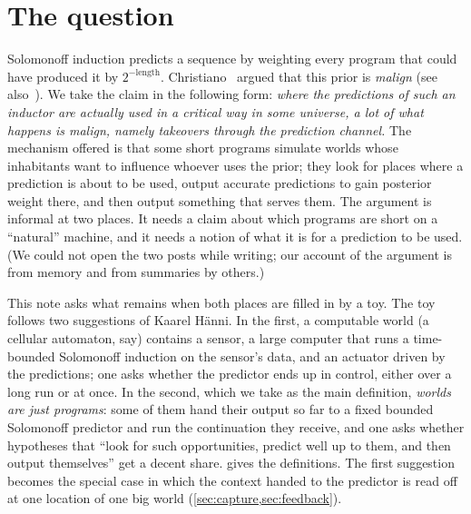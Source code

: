 \section{The question}\label{sec:question}

Solomonoff induction predicts a sequence by weighting every program that could have produced it by
$2^{-\text{length}}$. Christiano~\cite{christiano} argued that this prior is \emph{malign} (see
also~\cite{xu}). We take the claim in the following form: \emph{where the predictions of such an inductor are
actually used in a critical way in some universe, a lot of what happens is malign, namely takeovers through
the prediction channel.} The mechanism offered is that some short programs simulate worlds whose inhabitants
want to influence whoever uses the prior; they look for places where a prediction is about to be used, output
accurate predictions to gain posterior weight there, and then output something that serves them. The argument
is informal at two places. It needs a claim about which programs are short on a ``natural'' machine, and it
needs a notion of what it is for a prediction to be used. (We could not open the two posts while writing; our
account of the argument is from memory and from summaries by others.)

This note asks what remains when both places are filled in by a toy. The toy follows two suggestions of
Kaarel H\"anni. In the first, a computable world (a cellular automaton, say) contains a sensor, a large
computer that runs a time-bounded Solomonoff induction on the sensor's data, and an actuator driven by the
predictions; one asks whether the predictor ends up in control, either over a long run or at once. In the
second, which we take as the main definition, \emph{worlds are just programs}: some of them hand their
output so far to a fixed bounded Solomonoff predictor and run the continuation they receive, and one asks
whether hypotheses that ``look for such opportunities, predict well up to them, and then output themselves''
get a decent share.  gives the definitions. The first suggestion becomes the special case in
which the context handed to the predictor is read off at one location of one big world
(\cref{sec:capture,sec:feedback}).

